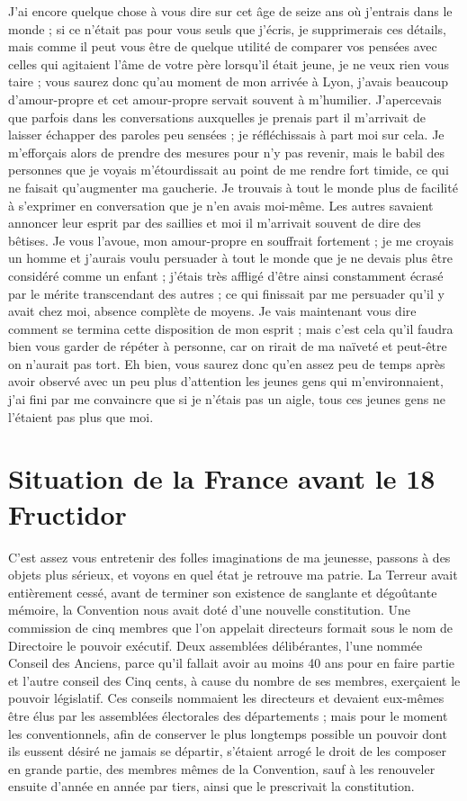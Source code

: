 \documentclass[11pt,a4paper]{report}
\begin{document}
J'ai encore quelque chose à vous dire sur cet âge de seize ans où j'entrais dans le monde ; si ce n'était pas pour vous seuls que j'écris, je supprimerais ces détails, mais comme il peut vous être de quelque utilité de comparer vos pensées avec celles qui agitaient l'âme de votre père lorsqu'il était jeune, je ne veux rien vous taire ; vous saurez donc qu'au moment de mon arrivée à Lyon, j'avais beaucoup d'amour-propre et cet amour-propre servait souvent à m'humilier. J'apercevais que parfois dans les conversations auxquelles je prenais part il m'arrivait de laisser échapper des paroles peu sensées ; je réfléchissais à part moi sur cela. Je m'efforçais alors de prendre des mesures pour n'y pas revenir, mais le babil des personnes que je voyais m'étourdissait au point de me rendre fort timide, ce qui ne faisait qu'augmenter ma gaucherie. Je trouvais à tout le monde plus de facilité à s'exprimer en conversation que je n'en avais moi-même. Les autres savaient annoncer leur esprit par des saillies et moi il m'arrivait souvent de dire des bêtises. Je vous l'avoue, mon amour-propre en souffrait fortement ; je me croyais un homme et j'aurais voulu persuader à tout le monde que je ne devais plus être considéré comme un enfant ; j'étais très affligé d'être ainsi constamment écrasé par le mérite transcendant des autres ; ce qui finissait par me persuader qu'il y avait chez moi, absence complète de moyens. Je vais maintenant vous dire comment se termina cette disposition de mon esprit ; mais c'est cela qu'il faudra bien vous garder de répéter à personne, car on rirait de ma naïveté et peut-être on n'aurait pas tort. Eh bien, vous saurez donc qu'en assez peu de temps après avoir observé avec un peu plus d'attention les jeunes gens qui m'environnaient, j'ai fini par me convaincre que si je n'étais pas un aigle, tous ces jeunes gens ne l'étaient pas plus que moi.

\section*{Situation de la France avant le 18 Fructidor}

C'est assez vous entretenir des folles imaginations de ma jeunesse, passons à des objets plus sérieux, et voyons en quel état je retrouve ma patrie. La Terreur avait entièrement cessé, avant de terminer son existence de sanglante et dégoûtante mémoire, la Convention nous avait doté d'une nouvelle constitution. Une commission de cinq membres que l'on appelait directeurs formait sous le nom de Directoire le pouvoir exécutif. Deux assemblées délibérantes, l'une nommée Conseil des Anciens, parce qu'il fallait avoir au moins 40 ans pour en faire partie et l'autre conseil des Cinq cents, à cause du nombre de ses membres, exerçaient le pouvoir législatif. Ces conseils nommaient les directeurs et devaient eux-mêmes être élus par les assemblées électorales des départements ; mais pour le moment les conventionnels, afin de conserver le plus longtemps possible un pouvoir dont ils eussent désiré ne jamais se départir, s'étaient arrogé le droit de les composer en grande partie, des membres mêmes de la Convention, sauf à les renouveler ensuite d'année en année par tiers, ainsi que le prescrivait la constitution.
\end{document}
